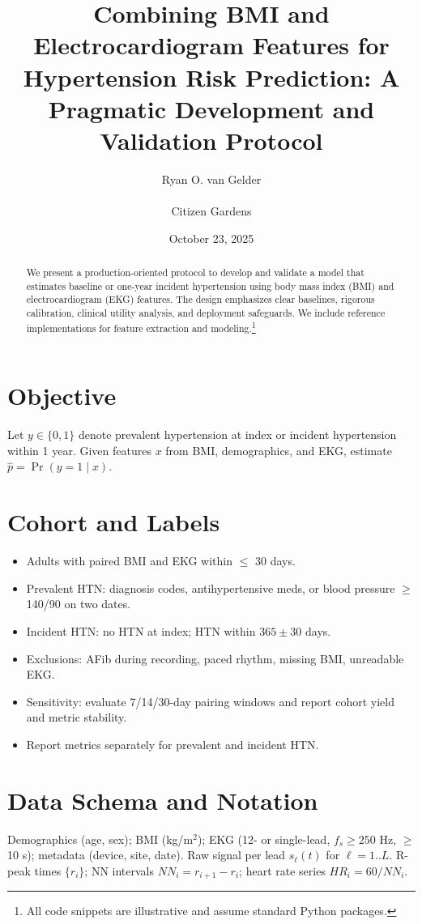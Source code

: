 \documentclass[11pt]{article}
\title{Combining BMI and Electrocardiogram Features for Hypertension Risk Prediction: A Pragmatic Development and Validation Protocol}
\author{Ryan O. van Gelder \\ \\ Citizen Gardens}
\date{October 23, 2025}
\begin{document}
\maketitle

\begin{abstract}
We present a production-oriented protocol to develop and validate a model that estimates baseline or one-year incident hypertension using body mass index (BMI) and electrocardiogram (EKG) features. The design emphasizes clear baselines, rigorous calibration, clinical utility analysis, and deployment safeguards. We include reference implementations for feature extraction and modeling.\footnote{All code snippets are illustrative and assume standard Python packages.}
\end{abstract}

\section{Objective}
Let $y\in\{0,1\}$ denote prevalent hypertension at index or incident hypertension within 1 year. Given features $x$ from BMI, demographics, and EKG, estimate $\hat p=\Pr(y=1\mid x)$.

\section{Cohort and Labels}
\begin{itemize}
  \item Adults with paired BMI and EKG within $\leq$ 30 days.
  \item Prevalent HTN: diagnosis codes, antihypertensive meds, or blood pressure $\geq$140/90 on two dates.
  \item Incident HTN: no HTN at index; HTN within $365\pm30$ days.
  \item Exclusions: AFib during recording, paced rhythm, missing BMI, unreadable EKG.
  \item Sensitivity: evaluate 7/14/30-day pairing windows and report cohort yield and metric stability.
  \item Report metrics separately for prevalent and incident HTN.
\end{itemize}

\section{Data Schema and Notation}
Demographics (age, sex); BMI (kg/m$^2$); EKG (12- or single-lead, $f_s\geq 250$ Hz, $\geq$10 s); metadata (device, site, date). Raw signal per lead $s_\ell(t)$ for $\ell=1..L$. R-peak times $\{r_i\}$; NN intervals $NN_i=r_{i+1}-r_i$; heart rate series $HR_i=60/NN_i$.
\end{document}
